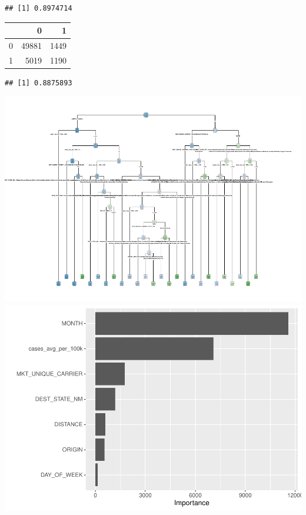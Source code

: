 \documentclass[
]{article}
\begin{document}
\begin{verbatim}
## [1] 0.8974714
\end{verbatim}

\begin{longtable}[]{@{}lrr@{}}
\toprule
& 0 & 1 \\
\midrule
\endhead
0 & 49881 & 1449 \\
1 & 5019 & 1190 \\
\bottomrule
\end{longtable}

\begin{verbatim}
## [1] 0.8875893
\end{verbatim}

\includegraphics{final-project_files/figure-latex/cancellation-tree-1.pdf}
\includegraphics{final-project_files/figure-latex/cancellation-tree-2.pdf}
\end{document}
